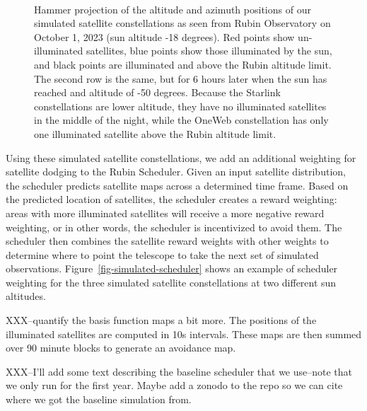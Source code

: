 \documentclass[linenumbers]{aastex631}
\begin{document}
\begin{figure}[ht!]
\\
\caption{Hammer projection of the altitude and azimuth positions of our simulated satellite constellations as seen from Rubin Observatory on October 1, 2023 (sun altitude -18 degrees). Red points show un-illuminated satellites, blue points show those illuminated by the sun, and black points are illuminated and above the Rubin altitude limit. The second row is the same, but for 6 hours later when the sun has reached and altitude of -50 degrees. Because the Starlink constellations are lower altitude, they have no illuminated satellites in the middle of the night, while the OneWeb constellation has only one illuminated satellite above the Rubin altitude limit. \label{fig-simulated-constellations} }
\end{figure}

Using these simulated satellite constellations, we add an additional weighting for satellite dodging to the Rubin Scheduler. Given an input satellite distribution, the scheduler predicts satellite maps across a determined time frame. Based on the predicted location of satellites, the scheduler creates a reward weighting: areas with more illuminated satellites will receive a more negative reward weighting, or in other words, the scheduler is incentivized to avoid them. The scheduler then combines the satellite reward weights with other weights to determine where to point the telescope to take the next set of simulated observations. Figure~\ref{fig-simulated-scheduler} shows an example of scheduler weighting for the three simulated satellite constellations at two different sun altitudes.

XXX--quantify the basis function maps a bit more. The positions of the illuminated satellites are computed in 10s intervals. These maps are then summed over 90 minute blocks to generate an avoidance map. 

XXX--I'll add some text describing the baseline scheduler that we use--note that we only run for the first year. Maybe add a zonodo to the repo so we can cite where we got the baseline simulation from.
\end{document}
